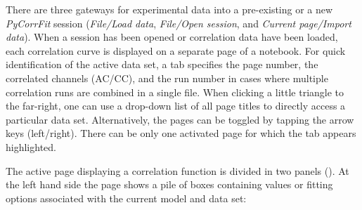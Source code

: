 There are three gateways for experimental data into a pre-existing or a new \textit{PyCorrFit} session (\textit{File/Load data}, \textit{File/Open session}, and \textit{Current page/Import data}). When a session has been opened or correlation data have been loaded, each correlation curve is displayed on a separate page of a notebook. For quick identification of the active data set, a tab specifies the page number, the correlated channels (AC/CC), and the run number in cases where  multiple correlation runs are combined in a single file. When clicking a little triangle to the far-right, one can use a drop-down list of all page titles to directly access a particular data set. Alternatively, the pages can be toggled by tapping the arrow keys (left/right). There can be only one activated page for which the tab appears highlighted.

The active page displaying a correlation function is divided in two panels (). At the left hand side the page shows a pile of boxes containing values or fitting options associated with the current model and data set: 

